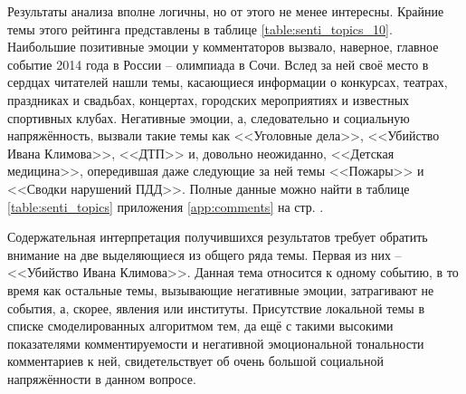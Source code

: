 Результаты анализа вполне логичны, но от этого не менее интересны. Крайние темы этого рейтинга представлены в таблице \ref{table:senti_topics_10}. Наибольшие позитивные эмоции у комментаторов вызвало, наверное, главное событие 2014 года в России -- олимпиада в Сочи. Вслед за ней своё место в сердцах читателей нашли темы, касающиеся информации о конкурсах, театрах, праздниках и свадьбах, концертах, городских мероприятиях и известных спортивных клубах. Негативные эмоции, а, следовательно и социальную напряжённость, вызвали такие темы как <<Уголовные дела>>, <<Убийство Ивана Климова>>, <<ДТП>> и, довольно неожиданно, <<Детская медицина>>, опередившая даже следующие за ней темы <<Пожары>> и <<Сводки нарушений ПДД>>. Полные данные можно найти в таблице \ref{table:senti_topics} приложения \ref{app:comments} на стр. \pageref{table:senti_topics}.

Содержательная интерпретация получившихся результатов требует обратить внимание на две выделяющиеся из общего ряда темы. Первая из них -- <<Убийство Ивана Климова>>. Данная тема относится к одному событию, в то время как остальные темы, вызывающие негативные эмоции, затрагивают не события, а, скорее, явления или институты. Присутствие локальной темы в списке смоделированных алгоритмом тем, да ещё с такими высокими показателями комментируемости и негативной эмоциональной тональности комментариев к ней, свидетельствует об очень большой социальной напряжённости в данном вопросе.

